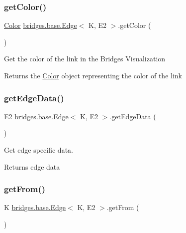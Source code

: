\subsubsection{\texorpdfstring{getColor()}{getColor()}}
{\footnotesize\ttfamily \mbox{\hyperlink{classbridges_1_1base_1_1_color}{Color}} \mbox{\hyperlink{classbridges_1_1base_1_1_edge}{bridges.\+base.\+Edge}}$<$ K, E2 $>$.get\+Color (\begin{DoxyParamCaption}{ }\end{DoxyParamCaption})}

Get the color of the link in the Bridges Visualization

\begin{DoxyReturn}{Returns}
the \mbox{\hyperlink{classbridges_1_1base_1_1_color}{Color}} object representing the color of the link 
\end{DoxyReturn}
\mbox{\label{classbridges_1_1base_1_1_edge_a19a623d647eb17b7e53f1360577b0703}} 
\subsubsection{\texorpdfstring{getEdgeData()}{getEdgeData()}}
{\footnotesize\ttfamily E2 \mbox{\hyperlink{classbridges_1_1base_1_1_edge}{bridges.\+base.\+Edge}}$<$ K, E2 $>$.get\+Edge\+Data (\begin{DoxyParamCaption}{ }\end{DoxyParamCaption})}

Get edge specific data.

\begin{DoxyReturn}{Returns}
edge data 
\end{DoxyReturn}
\mbox{\label{classbridges_1_1base_1_1_edge_afc23a7c2ee8ab4c4f0950c9bf25edd56}} 
\subsubsection{\texorpdfstring{getFrom()}{getFrom()}}
{\footnotesize\ttfamily K \mbox{\hyperlink{classbridges_1_1base_1_1_edge}{bridges.\+base.\+Edge}}$<$ K, E2 $>$.get\+From (\begin{DoxyParamCaption}{ }\end{DoxyParamCaption})}

